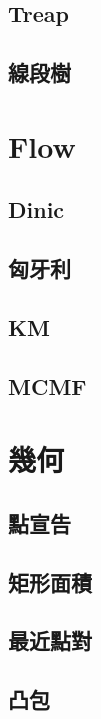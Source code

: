 \documentclass[a4paper,10pt,twocolumn,oneside]{article}
\begin{document}
\subsection{Treap}

\subsection{線段樹}

\section{Flow}
\subsection{Dinic}

\subsection{匈牙利}

\subsection{KM}

\subsection{MCMF}

\section{幾何}
\subsection{點宣告}

\subsection{矩形面積}

\subsection{最近點對}

\subsection{凸包}

\end{document}
